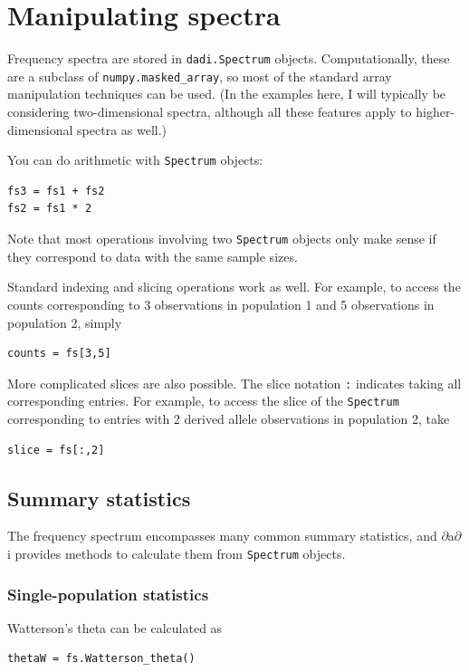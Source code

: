 \documentclass[12pt]{article}
\makeatletter
\newcommand{\dadi}{$\partial$a$\partial$i\xspace}
\newcommand{\py}[1]{\lstinline[language=Python, showstringspaces=False]@#1@}
\makeatother
\begin{document}
\section{Manipulating spectra}\label{sec:manip}

Frequency spectra are stored in \py{dadi.Spectrum} objects.
Computationally, these are a subclass of \py{numpy.masked_array}, so most of the standard array manipulation techniques can be used.
(In the examples here, I will typically be considering two-dimensional spectra, although all these features apply to higher-dimensional spectra as well.)

You can do arithmetic with \py{Spectrum} objects:
\begin{lstlisting}
fs3 = fs1 + fs2
fs2 = fs1 * 2
\end{lstlisting}
Note that most operations involving two \py{Spectrum} objects only make sense if they correspond to data with the same sample sizes.

Standard indexing and slicing operations work as well.
For example, to access the counts corresponding to 3 observations in population 1 and 5 observations in population 2, simply
\begin{lstlisting}
counts = fs[3,5]
\end{lstlisting}
More complicated slices are also possible.
The slice notation \py{:} indicates taking all corresponding entries.
For example, to access the slice of the \py{Spectrum} corresponding to entries with 2 derived allele observations in population 2, take
\begin{lstlisting}
slice = fs[:,2]
\end{lstlisting}

\subsection{Summary statistics}

The frequency spectrum encompasses many common summary statistics, and \dadi provides methods to calculate them from \py{Spectrum} objects.

\subsubsection{Single-population statistics}

Watterson's theta can be calculated as
\begin{lstlisting}
thetaW = fs.Watterson_theta()
\end{lstlisting}
\end{document}
